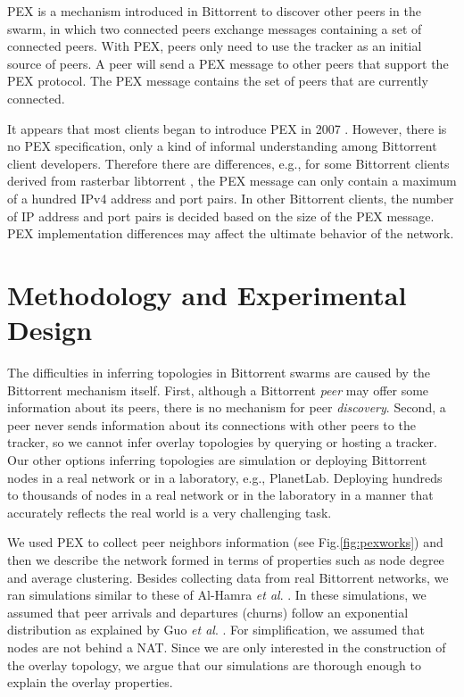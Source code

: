 \documentclass[paper]{ieice}
\begin{document}
PEX is a mechanism introduced in Bittorrent to discover other peers in the swarm, in which two connected peers exchange messages containing a set of connected peers.  
With PEX, peers only need to use the tracker as an initial source of peers.   
A peer will send a PEX message to other peers that support the PEX protocol. 
The PEX message contains the set of peers that are currently connected.

It appears that most clients began to introduce PEX in 2007  \cite{client}. 
However, there is no PEX specification, only a kind of informal understanding among Bittorrent client developers.
Therefore there are differences, e.g., for some Bittorrent clients derived from rasterbar libtorrent \cite{rasterbar}, the PEX message can only contain a maximum of a hundred IPv4 address and port pairs. 
In other Bittorrent clients, the number of IP address and port pairs is decided based on the size of the PEX message.  
PEX implementation differences may affect the ultimate behavior of the network.

\section{Methodology and Experimental Design}\label{methodanddesign}
The difficulties in inferring topologies in Bittorrent swarms are caused by the Bittorrent mechanism itself. 
First, although a Bittorrent \textit{peer} may offer some information about its peers, there is no mechanism for peer \textit{discovery}.  
Second, a peer never sends information about its connections with other peers to the tracker, so we cannot infer overlay topologies by querying or hosting a tracker.  
Our other options inferring topologies are simulation or deploying Bittorrent nodes in a real network or in a laboratory, e.g., PlanetLab. Deploying hundreds to thousands of nodes in a real network or in the laboratory in a manner that accurately reflects the real world is a very challenging task.

We used PEX to collect peer neighbors information  (see Fig.\ref{fig:pexworks}) and then we describe the network formed in terms of properties such as node degree and average clustering. 
Besides collecting data from real Bittorrent networks, we ran simulations similar to these of Al-Hamra \textit{et al}. \cite{al2009swarming}. 
In these simulations, we assumed that peer arrivals and departures (churns) follow an exponential distribution as explained by Guo \textit{et al}. \cite{guo2005measurements}. 
For simplification, we assumed that nodes are not behind a NAT.
Since we are only interested in the construction of the overlay topology, we argue that our simulations are thorough enough to explain the overlay properties.
\end{document}
